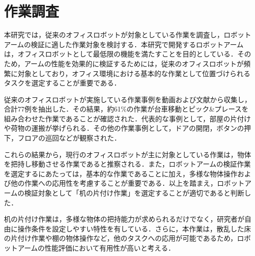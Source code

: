 \section{作業調査}
本研究では，従来のオフィスロボットが対象としている作業を調査し，ロボットアームの検証に適した作業対象を検討する．本研究で開発するロボットアームは，オフィスロボットとして最低限の機能を満たすことを目的としている．そのため，アームの性能を効果的に検証するためには，従来のオフィスロボットが頻繁に対象としており，オフィス環境における基本的な作業として位置づけられるタスクを選定することが重要である．

従来のオフィスロボットが実施している作業事例を動画および文献から収集し，合計77例を抽出した．その結果，約61\%の作業が台車移動とピック\&プレースを組み合わせた作業であることが確認された．代表的な事例として，部屋の片付けや荷物の運搬が挙げられる．その他の作業事例として，ドアの開閉，ボタンの押下，フロアの巡回などが観察された．

これらの結果から，現行のオフィスロボットが主に対象としている作業は，物体を把持し移動させる作業であると推察される．また，ロボットアームの検証作業を選定するにあたっては，基本的な作業であることに加え，多様な物体操作および他の作業への応用性を考慮することが重要である．以上を踏まえ，ロボットアームの検証対象として「机の片付け作業」を選定することが適切であると判断した．

机の片付け作業は，多様な物体の把持能力が求められるだけでなく，研究者が自由に操作条件を設定しやすい特性を有している．さらに，本作業は，散乱した床の片付け作業や棚の物体操作など，他のタスクへの応用が可能であるため，ロボットアームの性能評価において有用性が高いと考える．
\newpage